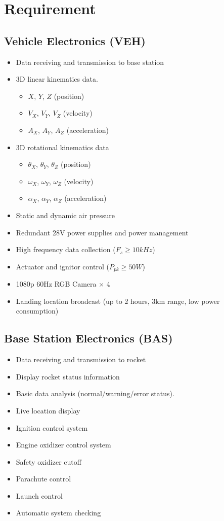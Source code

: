 \documentclass[12pt,article]{memoir}
\begin{document}
\section{Requirement}
\subsection{Vehicle Electronics (VEH)}
\begin{itemize}
\item Data receiving and transmission to base station
\item 3D linear kinematics data.
\begin{itemize}
	\item $X$, $Y$, $Z$ (position)
	\item $V_X$, $V_Y$, $V_Z$ (velocity)
	\item $A_X$, $A_Y$, $A_Z$ (acceleration)
\end{itemize}
\item 3D rotational kinematics data
\begin{itemize}
	\item $\theta_X$, $\theta_Y$, $\theta_Z$ (position)
	\item $\omega_X$, $\omega_Y$, $\omega_Z$ (velocity)
	\item $\alpha_X$, $\alpha_Y$, $\alpha_Z$ (acceleration)
\end{itemize}
\item Static and dynamic air pressure
\item Redundant 28V power supplies and power management
\item High frequency data collection ($F_s \geq 10kHz$)
\item Actuator and ignitor control ($P_{pk} \geq 50W$)
\item 1080p 60Hz RGB Camera $\times$ 4
\item Landing location broadcast (up to 2 hours, 3km range, low power consumption)
\end{itemize}
\subsection{Base Station Electronics (BAS)}
\begin{itemize}
\item Data receiving and transmission to rocket
\item Display rocket status information 
\item Basic data analysis (normal/warning/error status).
\item Live location display
\item Ignition control system
\item Engine oxidizer control system
\item Safety oxidizer cutoff
\item Parachute control
\item Launch control
\item Automatic system checking
\end{itemize}
\end{document}
